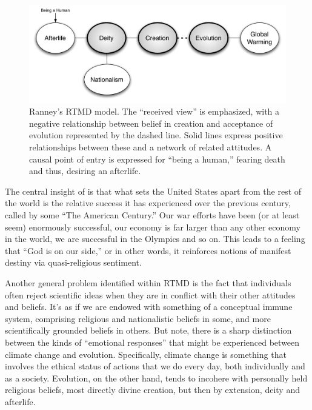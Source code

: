 \begin{figure}[h]
\centering
\includegraphics[width=\textwidth]{rtmd.pdf}
\caption{Ranney's RTMD model. The ``received view'' is emphasized, with
a negative relationship between belief in creation and acceptance of evolution
represented by the dashed line. Solid lines express positive relationships
between these and a network of related attitudes. A causal point of entry is
expressed for ``being a human,'' fearing death and thus, desiring an afterlife.}
\label{fig:rtmd} 
\end{figure}

The central insight of \citeauthor{ranney_accepting_2011} is that what sets the
United States apart from the rest of the world is the relative success it has
experienced over the previous century, called by some ``The American Century.''
Our war efforts have been (or at least seem) enormously successful, our economy
is far larger than any other economy in the world, we are successful in the
Olympics and so on. This leads to a
feeling that ``God is on our side,'' or in other words, it reinforces notions of
manifest destiny via quasi-religious sentiment.


Another general problem identified within RTMD is the fact that individuals
often reject scientific ideas when they are in conflict with their other
attitudes and beliefs. It's as if we are endowed with something of a conceptual
immune system, %
comprising religious and nationalistic beliefs in some, and more
scientifically grounded beliefs in others.  But note, there is a sharp distinction between
the kinds of ``emotional responses'' that might be experienced between climate
change and evolution. Specifically, climate change is something that
involves the ethical status of actions that we do every day, both individually
and as a society. Evolution, on the other hand, tends to incohere with
personally held religious beliefs, most directly divine creation, but then by
extension, deity and afterlife.

